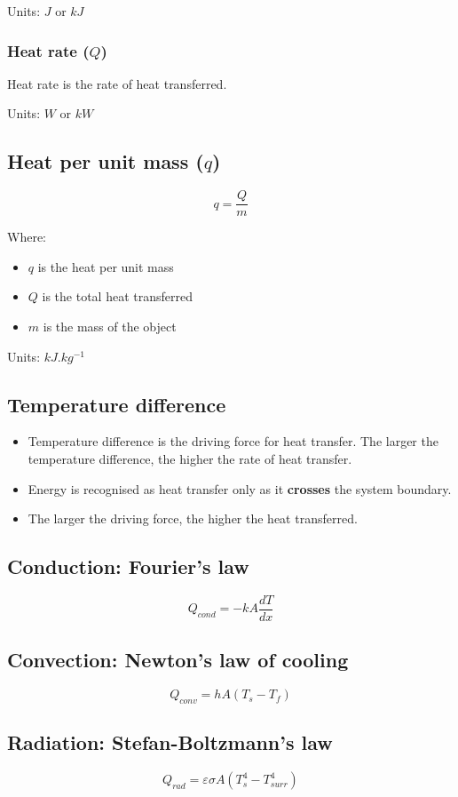 \documentclass[11pt]{article}
\begin{document}
Units: \(\unit{J}\) or \(\unit{kJ}\)
\subsubsection{Heat rate (\(Q\))}
\label{sec:orgfbc6da6}
Heat rate is the rate of heat transferred.


 \noindent Units: \(\unit{W}\) or \(\unit{kW}\)
\subsection{Heat per unit mass (\(q\))}
\label{sec:org6fa94fc}
\[q = \frac{Q}{m}\]

Where:
\begin{itemize}
\item \(q\) is the heat per unit mass
\item \(Q\) is the total heat transferred
\item \(m\) is the mass of the object
\end{itemize}

Units: \(\unit{kJ.kg^{-1}}\)
\subsection{Temperature difference}
\label{sec:org76e328f}
\begin{itemize}
\item Temperature difference is the driving force for heat transfer. The larger the temperature difference, the higher the rate of heat transfer.
\item Energy is recognised as heat transfer only as it \textbf{crosses} the system boundary.
\item The larger the driving force, the higher the heat transferred.
\end{itemize}
\subsection{Conduction: Fourier's law}
\label{sec:org806501c}
\[Q_{cond} = -kA \frac{dT}{dx}\]
\subsection{Convection: Newton's law of cooling}
\label{sec:org8787f06}
\[Q_{conv} = hA(T_s - T_f)\]
\subsection{Radiation: Stefan-Boltzmann's law}
\label{sec:org353a9aa}
\[Q_{rad} = \varepsilon \sigma A(T_s^4 - T_{surr}^4)\]
\end{document}
